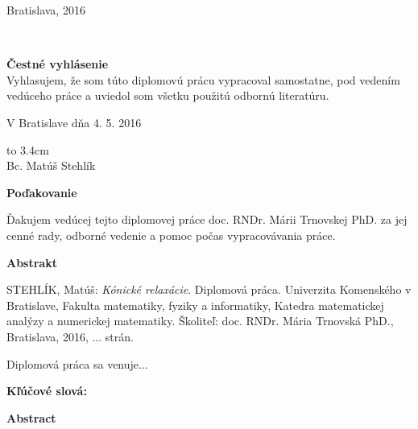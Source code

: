 \documentclass[12pt]{book}
\theoremstyle{definition}
\def\mfplacedate{Bratislava, 2016}
\begin{document}
\hfill\mfplacedate
\eject %






\eject %

{~}\vspace{12cm}

\noindent
\begin{minipage}{1\textwidth}
{\bf Čestné vyhlásenie} \\
Vyhlasujem, že som túto diplomovú prácu vypracoval samostatne, pod vedením vedúceho práce a uviedol som všetku použitú odbornú literatúru.\\

\medskip

V Bratislave dňa 4. 5. 2016

\bigskip\bigskip

\hfill\hbox to 3.4cm{\dotfill} \\
\medskip
\hfill{Bc. Matúš Stehlík}\\ 
\end{minipage}
\vfill\null\eject %

\centerline{\large\bf Poďakovanie}

\medskip

Ďakujem vedúcej tejto diplomovej práce doc. RNDr. Márii Trnovskej PhD. za jej cenné rady, odborné vedenie a pomoc počas vypracovávania práce.

\vfill\null\eject

\centerline{\large\bf Abstrakt}

\medskip

STEHLÍK, Matúš: {\it Kónické relaxácie}. Diplomová práca. Univerzita Komenského v Bratislave, Fakulta matematiky, fyziky a informatiky, Katedra matematickej analýzy a numerickej matematiky. Školiteľ: doc. RNDr. Mária Trnovská PhD., Bratislava, 2016, ... strán.

\bigskip

\hspace*{1 cm} 
Diplomová práca sa venuje... %

\bigskip

{\bf Kľúčové slová: } \\

\newpage

\centerline{\large\bf Abstract}

\medskip
\end{document}
